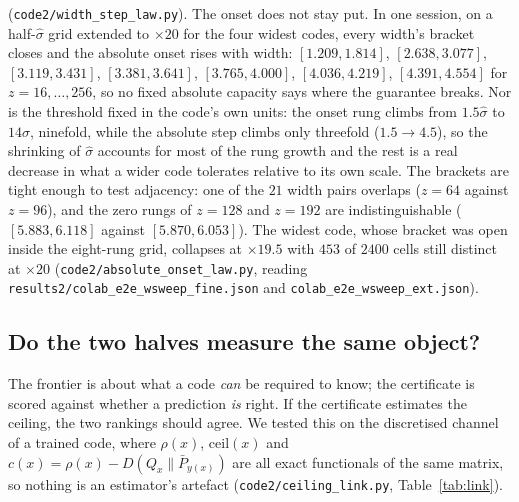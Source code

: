 \documentclass[11pt]{article}
\begin{document}
(\texttt{code2/width\_step\_law.py}). The onset does not stay put. In one session, on a half-$\hat\sigma$ grid extended to $\times20$ for
the four widest codes, every width's bracket closes and the absolute onset rises with width:
$[1.209,1.814]$,
$[2.638,3.077]$, $[3.119,3.431]$, $[3.381,3.641]$, $[3.765,4.000]$, $[4.036,4.219]$,
$[4.391,4.554]$ for $z=16,\dots,256$, so no fixed absolute capacity says where the guarantee breaks.
Nor is the threshold fixed in the code's own units: the onset rung climbs from $1.5\hat\sigma$ to
$14\hat\sigma$, ninefold, while the absolute step climbs only threefold ($1.5\to4.5$), so the
shrinking of $\hat\sigma$ accounts for most of the rung growth and the rest is a real decrease in
what a wider code tolerates relative to its own scale. The brackets are tight enough to test
adjacency: one of the $21$ width pairs overlaps ($z=64$ against $z=96$), and the zero rungs of
$z=128$ and $z=192$ are indistinguishable ($[5.883,6.118]$ against $[5.870,6.053]$). The widest
code, whose bracket was open inside the eight-rung grid, collapses at $\times19.5$ with $453$ of
$2400$ cells still distinct at $\times20$
(\texttt{code2/absolute\_onset\_law.py}, reading \texttt{results2/colab\_e2e\_wsweep\_fine.json}
and \texttt{colab\_e2e\_wsweep\_ext.json}).

\subsection{Do the two halves measure the same object?}\label{sec:link}
The frontier is about what a code \emph{can} be required to know; the certificate is scored
against whether a prediction \emph{is} right. If the certificate estimates the ceiling, the two
rankings should agree. We tested this on the discretised channel of a trained code, where
$\rho(x)$, $\mathrm{ceil}(x)$ and $c(x)=\rho(x)-D(Q_x\|\bar P_{y(x)})$ are all exact functionals of
the same matrix, so nothing is an estimator's artefact
(\texttt{code2/ceiling\_link.py}, Table~\ref{tab:link}).
\end{document}
